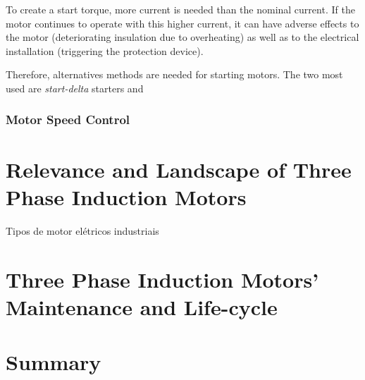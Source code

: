 To create a start torque, more current is needed than the nominal current. 
If the motor continues to operate with this higher current, it can have adverse effects to the motor (deteriorating insulation due to overheating) as well as to the electrical installation (triggering the protection device).

Therefore, alternatives methods are needed for starting motors. The two most used are \emph{start-delta} starters and 

\subsubsection{Motor Speed Control}


\section{Relevance and Landscape of Three Phase Induction Motors} %
\label{sec:tpin_relevance}
Tipos de motor elétricos industriais ~\cite{Ferreira1}


\section{Three Phase Induction Motors' Maintenance and Life-cycle} %
\label{sec:Three_phase_induction_motors_maintenance_and_lyfe_cycle}

\section{Summary} %
\label{sec:tpem_summary}
